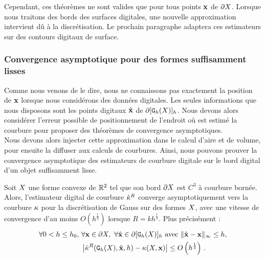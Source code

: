 %
Cependant, ces théorèmes ne sont valides que pour tous points $\mathbf{x}$ de $\partial X$.
Lorsque nous traitons des bords des surfaces digitales, une nouvelle
approximation intervient dû à la discrétisation. Le prochain paragraphe adaptera
ces estimateurs sur des contours digitaux de surface.
%
\subsubsection{Convergence asymptotique pour des formes suffisamment lisses}
%
Comme nous venons de le dire, nous ne connaissons pas exactement la position de
$\mathbf{x}$ lorsque nous considérons des données digitales. Les seules informations
que nous disposons sont les points digitaux $\hat{\mathbf{x}}$ de $\partial \lbrack \mathtt{G}_{h}(X) \rbrack_{h}$.
Nous devons alors considérer l'erreur possible de positionnement de l'endroit où
est estimé la courbure pour proposer des théorèmes de convergence
asymptotiques.\\
%
Nous devons alors injecter cette approximation dans le calcul d'aire et de
volume, pour ensuite la diffuser aux calculs de courbures. Ainsi, nous pouvons
prouver la convergence asymptotique des estimateurs de courbure digitale sur le
bord digital d'un objet suffisamment lisse.
%
\begin{theorem} \label{thm:multigrid-convergence-curv}
%
Soit $X$ une forme convexe de $\mathbb{R}^2$ tel que son bord $\partial X$ est $C^3$ à
courbure bornée. Alors, l'estimateur digital de courbure $\hat{\kappa}^{R}$ converge
asymptotiquement vers la courbure $\kappa$ pour la discrétisation de Gauss sur
des formes $X$, avec une vitesse de convergence d'au moins
$O(h^\frac{1}{3})$ lorsque $R = kh^\frac{1}{3}$. Plus précisément :
%
\begin{align}
  \forall 0 < h \le h_0,\,\, & \forall \mathbf{x} \in \partial X,\,\,
  \forall \hat{\mathbf{x}} \in \partial \lbrack \mathtt{G}_{h}(X) \rbrack_{h} \text{~avec~} \| \hat{\mathbf{x}} -\mathbf{x}\|_\infty \le h, \nonumber \\
  & \left| \hat{\kappa}^{R}(\mathtt{G}_{h}(X), \hat{\mathbf{x}}, h) - \kappa(X, \mathbf{x}) \right| \le O\left(h^{\frac{1}{3}}\right)\,.
\end{align}
%
\end{theorem}
%
